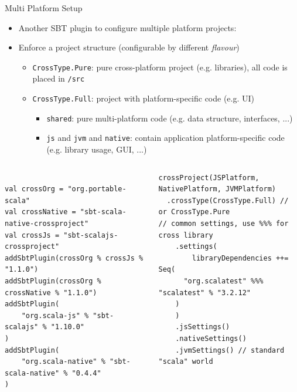 \documentclass[presentation, 9pt]{beamer}\mode<presentation>{\usetheme{AMSBolognaFC}}
\begin{document}
\begin{frame}[fragile]{Multi Platform Setup \href{https://github.com/unibo-pps/scala-cross-project}{\faLink}}
	\begin{itemize}
		\item Another SBT plugin to configure multiple platform projects:  \href{https://github.com/portable-scala/sbt-crossproject}{\faLink}
  	\item Enforce a project structure (configurable by different \emph{flavour})
		\begin{itemize}
			\item \texttt{CrossType.Pure}: pure cross-platform project (e.g. libraries), all code is placed in \texttt{/src}
   		\item \texttt{CrossType.Full}: project with platform-specific code (e.g. UI)
			\begin{itemize}
				\item \texttt{shared}: pure multi-platform code (e.g. data structure, interfaces, ...)
    		\item \texttt{js} and \texttt{jvm} and \texttt{native}: contain application platform-specific code (e.g. library usage, GUI, ...)
			\end{itemize}
		\end{itemize}
	\end{itemize}
	\begin{columns}
		\begin{column}[c]{0.5\textwidth}
			\begin{tcolorbox}[left=0pt, top=0pt, bottom=0pt, title=project/plugins.sbt]
				\begin{verbatim}

val crossOrg = "org.portable-scala"
val crossNative = "sbt-scala-native-crossproject"
val crossJs = "sbt-scalajs-crossproject"
addSbtPlugin(crossOrg % crossJs % "1.1.0")
addSbtPlugin(crossOrg % crossNative % "1.1.0")
addSbtPlugin(
	"org.scala-js" % "sbt-scalajs" % "1.10.0"
)
addSbtPlugin(
	"org.scala-native" % "sbt-scala-native" % "0.4.4"
)
				\end{verbatim}
			\end{tcolorbox}
		\end{column}

		\begin{column}[c]{0.5\textwidth}
			\begin{tcolorbox}[left=0pt, top=0pt, bottom=0pt, title=build.sbt]
				\begin{verbatim}
crossProject(JSPlatform, NativePlatform, JVMPlatform)
  .crossType(CrossType.Full) // or CrossType.Pure
// common settings, use %%% for cross library
	.settings(
		libraryDependencies ++= Seq(
      "org.scalatest" %%% "scalatest" % "3.2.12"
    )
	)
	.jsSettings()
	.nativeSettings()
	.jvmSettings() // standard "scala" world
				\end{verbatim}
			\end{tcolorbox}
		\end{column}
	\end{columns}
\end{frame}
\end{document}
